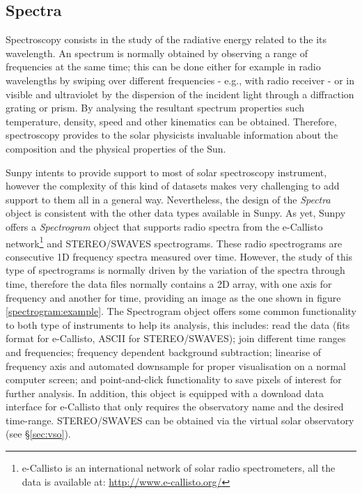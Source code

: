 \subsection{Spectra}\label{sec:spectra}

Spectroscopy consists in the study of the radiative energy related to the its wavelength.
An spectrum is normally obtained by observing a range of frequencies at the same time; 
this can be done either for example in radio wavelengths by swiping over different frequencies - e.g., with radio receiver - 
or in visible and ultraviolet by the dispersion of the incident light through a diffraction grating or prism.
By analysing the resultant spectrum properties such temperature, density, speed and other kinematics can be obtained. Therefore, spectroscopy provides to the solar physicists invaluable information about the composition and the physical properties of the Sun.  

Sunpy intents to provide support to most of solar spectroscopy instrument, however the complexity of this kind of datasets makes very challenging to add support to them all in a general way.  
Nevertheless, the design of the \textit{Spectra} object is consistent with the other data types available in Sunpy.
As yet, Sunpy offers a \textit{Spectrogram} object that supports radio spectra from the e-Callisto 
network\footnote{e-Callisto is an international network of solar radio spectrometers, all the data is available at: \url{http://www.e-callisto.org/} } 
and STEREO/SWAVES spectrograms.
These radio spectrograms are consecutive 1D frequency spectra measured over time.  
However, the study of this type of spectrograms is normally driven by the variation of the spectra through time, therefore the data files normally contains a 2D array, with one axis for frequency and another for time, providing an image as the one shown in figure \ref{spectrogram:example}.
The Spectrogram object offers some common functionality to both type of instruments to help its analysis, this includes:
read the data (fits format for e-Callisto, ASCII for STEREO/SWAVES); 
join different time ranges and frequencies; 
frequency dependent background subtraction;  
linearise of frequency axis and automated downsample for proper visualisation on a normal computer screen;  
and point-and-click functionality to save pixels of interest for further analysis.
In addition, this object is equipped with a download data interface for e-Callisto that only requires the observatory name and the desired time-range. STEREO/SWAVES can be obtained via the virtual solar observatory (see \S\ref{sec:vso}).



